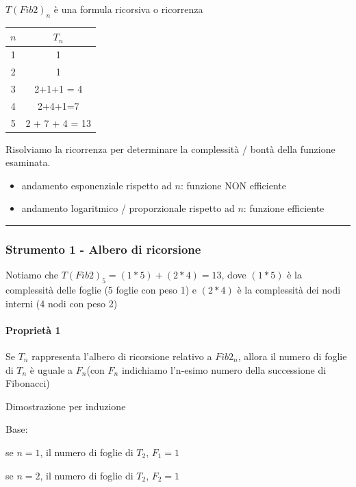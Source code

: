 {{{{$T(Fib2)_n$ è una formula ricorsiva o ricorrenza}


\begin{tabular}{|c|c|}
\hline 
$n$ & $T_n$ \\ 
\hline 
1 & 1 \\ 
\hline 
2 & 1 \\ 
\hline 
3 & 2+1+1 = 4 \\ 
\hline 
4 & 2+4+1=7 \\ 
\hline 
5 & 2 + 7 + 4 = 13 \\ 
\hline 
\end{tabular} 

{Risolviamo la ricorrenza per determinare la complessità / bontà della funzione esaminata.}

\begin{itemize}
\tightlist
\item
  {andamento esponenziale rispetto ad $n$: funzione NON efficiente}
\item
  {andamento logaritmico / proporzionale rispetto ad $n$: funzione
  efficiente}
\end{itemize}

\begin{center}\rule{0.5\linewidth}{\linethickness}\end{center}

\subsubsection{Strumento 1 - Albero di ricorsione}

{Notiamo che $T(Fib2)_5=(1*5)+(2*4)=13$, dove $(1 * 5)$ è la complessità delle foglie (5 foglie con peso 1) e $(2 * 4)$ è la complessità dei nodi interni (4 nodi con peso 2)}



\paragraph{Proprietà 1}

{Se $T_n$ rappresenta l'albero di ricorsione relativo a $Fib2_n$, allora il numero di foglie di $T_n$ è uguale a $F_n$(con $F_n$ indichiamo l'n-esimo numero della successione di Fibonacci)}

{Dimostrazione per induzione}

{Base:}

{se $n = 1$, il numero di foglie di $T_2$, $F_1=1$}

{se $n = 2$, il numero di foglie di $T_2$, $F_2=1$}

}}}
